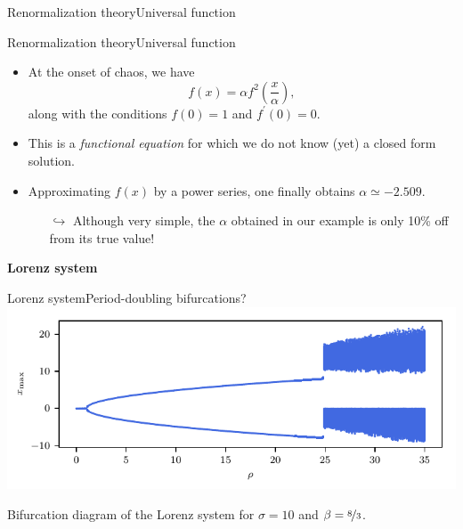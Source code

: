 \documentclass[usenames,dvipsnames,svgnames,10pt,aspectratio=169]{beamer}
\begin{document}
\begin{frame}[t, c]{Renormalization theory}{Universal function}

\end{frame}

\begin{frame}[t, c]{Renormalization theory}{Universal function}
	\begin{itemize}
		\item At the onset of chaos, we have
		$$f(x) = \alpha f^2 \left( \displaystyle \frac{x}{\alpha} \right),$$
		along with the conditions $f(0) = 1$ and $f^{\prime}(0) = 0$.

		\bigskip

		\item This is a \emph{functional equation} for which we do not know (yet) a closed form solution.

		\bigskip

		\item Approximating $f(x)$ by a power series, one finally obtains $\alpha \simeq -2.509$.
		\begin{itemize}
			\item[$\hookrightarrow$] Although very simple, the $\alpha$ obtained in our example is only 10\% off from its true value!
		\end{itemize}
	\end{itemize}

	\vspace{1cm}
\end{frame}

\begin{frame}[t, c]{}
	\centering
	\vspace{1cm}

	{\Large \textbf{Lorenz system}}

	\bigskip

	{}

\end{frame}

\begin{frame}[t, c]{Lorenz system}{Period-doubling bifurcations?}
	\centering
	\includegraphics[width=.75\textwidth]{lorenz_bifurcation_diagram_1}

	Bifurcation diagram of the Lorenz system for $\sigma=10$ and $\beta = \nicefrac{8}{3}$.
	\vspace{1cm}
\end{frame}
\end{document}
